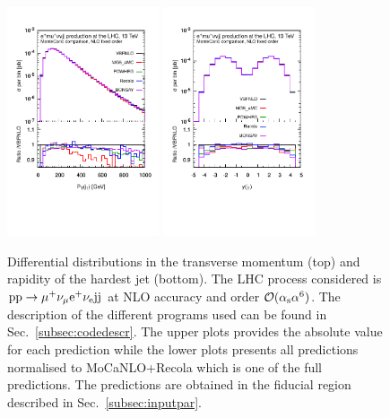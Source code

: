  \begin{figure}[hbt!]
   \centering
   \includegraphics[width=0.4\textwidth,angle=0,clip=true,trim={0.4cm 2cm 0.cm 1.cm}]{figures/NLO/ptj1_NLO.pdf}
   \includegraphics[width=0.4\textwidth,angle=0,clip=true,trim={0.4cm 2cm 0.cm 1.cm}]{figures/NLO/yj1_NLO.pdf}
\caption{\label{fig:distNLO2} Differential distributions in the transverse momentum (top) and rapidity of the hardest jet (bottom).
The LHC process considered is ${\rm p}{\rm p}\to\mu^+\nu_\mu{\rm e}^+\nu_{\rm e}{\rm j}{\rm j}$ at NLO accuracy and order $\mathcal{O}(\alpha_{\rm s}\alpha^6)$.
The description of the different programs used can be found in Sec.~\ref{subsec:codedescr}.
The upper plots provides the absolute value for each prediction while the lower plots presents all predictions normalised to {\sc MoCaNLO}+{\sc Recola} which is one of the full predictions.
The predictions are obtained in the fiducial region described in Sec.~\ref{subsec:inputpar}.
}
\end{figure}

